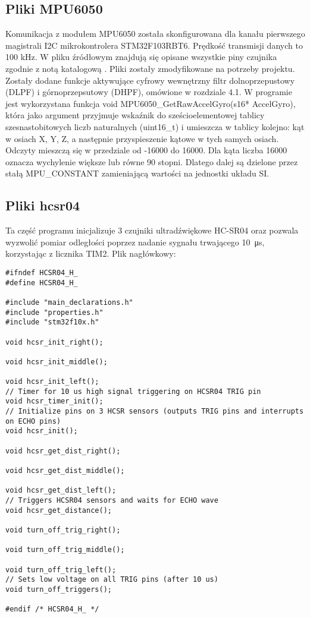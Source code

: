 \documentclass[a4paper,12pt,twoside,openany]{report}
\begin{document}
\subsection{Pliki MPU6050}

Komunikacja z modułem MPU6050 została skonfigurowana dla kanału pierwszego magistrali I2C mikrokontrolera STM32F103RBT6. Prędkość transmisji danych to 100 kHz. W pliku źródłowym znajdują się opisane wszystkie piny czujnika zgodnie z notą katalogową \cite{mpureg}. Pliki zostały zmodyfikowane na potrzeby projektu. Zostały dodane funkcje aktywujące cyfrowy wewnętrzny filtr dolnoprzepustowy (DLPF) i górnoprzepsutowy (DHPF), omówione w rozdziale 4.1. W programie jest wykorzystana funkcja void MPU6050\_GetRawAccelGyro(s16* AccelGyro), która jako argument przyjmuje wskaźnik do sześcioelementowej tablicy szesnastobitowych liczb naturalnych (uint16\_t) i umieszcza w tablicy kolejno: kąt w osiach X, Y, Z, a następnie przyspieszenie kątowe w tych samych osiach. Odczyty mieszczą się w przedziale od -16000 do 16000. Dla kąta liczba 16000 oznacza wychylenie większe lub równe 90 stopni. Dlatego dalej są dzielone przez stałą MPU\_CONSTANT zamieniającą wartości na jednostki układu SI.



\subsection{Pliki hcsr04}

Ta część programu inicjalizuje 3 czujniki ultradźwiękowe HC-SR04 oraz pozwala wyzwolić pomiar odległości poprzez nadanie sygnału trwającego \SI{10}{\micro s}, korzystając z licznika TIM2. Plik nagłówkowy:\\
\begin{lstlisting}[style=customc]
#ifndef HCSR04_H_
#define HCSR04_H_

#include "main_declarations.h"
#include "properties.h"
#include "stm32f10x.h"

void hcsr_init_right();

void hcsr_init_middle();

void hcsr_init_left();
// Timer for 10 us high signal triggering on HCSR04 TRIG pin
void hcsr_timer_init();
// Initialize pins on 3 HCSR sensors (outputs TRIG pins and interrupts on ECHO pins)
void hcsr_init();

void hcsr_get_dist_right();

void hcsr_get_dist_middle();

void hcsr_get_dist_left();
// Triggers HCSR04 sensors and waits for ECHO wave
void hcsr_get_distance();

void turn_off_trig_right();

void turn_off_trig_middle();

void turn_off_trig_left();
// Sets low voltage on all TRIG pins (after 10 us)
void turn_off_triggers();

#endif /* HCSR04_H_ */

\end{lstlisting}
\end{document}
